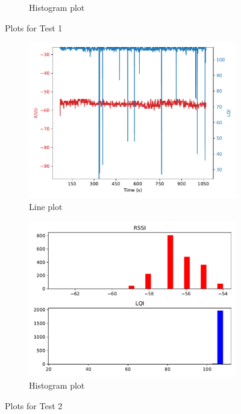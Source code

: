 \documentclass[runningheads]{llncs}
\begin{document}
\begin{figure}[ht]
\begin{subfigure}[b]{0.45\textwidth}
        \caption{Histogram plot}
    \end{subfigure}
    \caption{Plots for Test 1}
\end{figure}

\begin{figure}[ht]
    \centering
    \begin{subfigure}[b]{0.45\textwidth}
        \centering
        \includegraphics[width=\textwidth]{images/1-50--12-26-line.pdf}
        \caption{Line plot}
    \end{subfigure}
    \hfill
    \begin{subfigure}[b]{0.45\textwidth}
        \centering
        \includegraphics[width=\textwidth]{images/1-50--12-26-histogram.pdf}
        \caption{Histogram plot}
    \end{subfigure}
    \caption{Plots for Test 2}
\end{figure}
\end{document}
